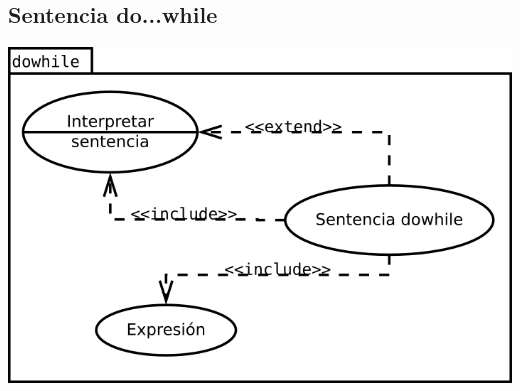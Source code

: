 \subsection {Sentencia do...while}
\begin{center}
\includegraphics[scale=0.4]{dowhile.png} \\
\end{center}
